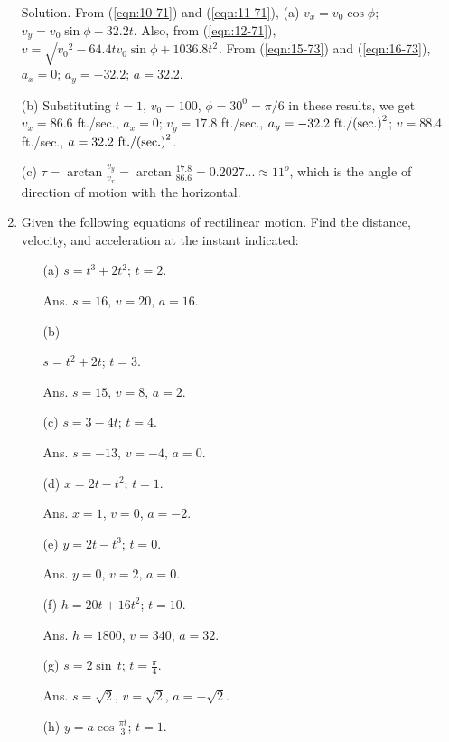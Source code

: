 \begin{enumerate}
Solution. From (\ref{eqn:10-71}) and (\ref{eqn:11-71}),
(a) $v_x = v_0 \cos \phi$; \ $v_y = v_0 \sin \phi - 32.2 t$.
Also, from (\ref{eqn:12-71}), 
$v = \sqrt{{v_0}^2 - 64.4 t v_0 \sin \phi + 1036.8 t^2}$.
From (\ref{eqn:15-73}) and (\ref{eqn:16-73}), 	
$a_x = 0$; $a_y = − 32.2$; $a =  32.2$.

(b) Substituting $t = 1$, $v_0 = 100$, $\phi = 30^0=\pi/6$ in these 
results, we get
  	$v_x = 86.6$ ft./sec., $a_x = 0$;
  	$v_y = 17.8$ ft./sec., $a_y = - 32.2\ \fps2$;
  	$v = 88.4$ ft./sec., $a = 32.2\ \fps2$.

(c) 	
$\tau = \arctan \frac{v_y}{v_x} = \arctan \frac{17.8}{86.6} = 0.2027...
\approx 11^o$, which is the angle of direction of motion with the horizontal.

\item
Given the following equations of rectilinear motion. 
Find the distance, velocity, and acceleration at the instant indicated:

\begin{itemize}
\item[(a)] 
$s = t^3 + 2t^2$; $t = 2$. 	

Ans. 	$s = 16$, $v = 20$, $a = 16$.

\item[(b)] 

$s = t^2 + 2t$; $t = 3$. 	

Ans. $s = 15$, $v = 8$, $a = 2$.

\item[(c)] 
$s = 3 - 4t$; $t = 4$. 	

Ans. $s = - 13$, $v = - 4$, $a = 0$.

\item[(d)] 
$x = 2t - t^2$; $t = 1$. 	

Ans. $x = 1$, $v = 0$, $a = - 2$.

\item[(e)] 
$y = 2t - t^3$; $t = 0$. 	

Ans. $y = 0$, $v = 2$, $a = 0$.

\item[(f)] 
$h = 20t + 16t^2$; $t = 10$. 	

Ans. $h = 1800$, $v = 340$, $a = 32$.

\item[(g)] 
$s = 2 \sin\, t$; $t = \frac{\pi}{4}$. 	

Ans. $s = \sqrt{2}$, $v = \sqrt{2}$, $a= - \sqrt{2}$.

\item[(h)] 
$y = a \cos \frac{\pi t}{3}$; $t = 1$. 	


\end{itemize}
\end{enumerate}
